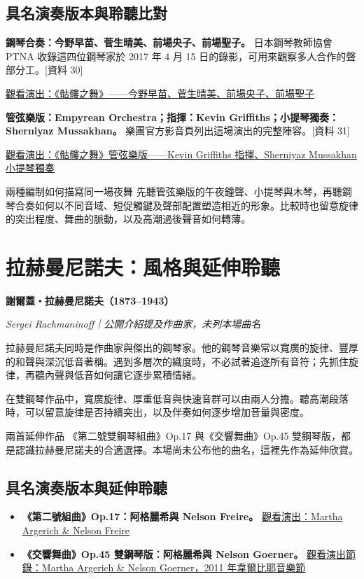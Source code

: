 \documentclass[UTF8,12pt,a4paper,fontset=none]{ctexart}
\newcommand{\src}[1]{{\small\color{accent}[資料 #1]}}
\newcommand{\work}[2]{\textbf{#1}\par{\small\itshape #2}\par}
\begin{document}
\subsection{具名演奏版本與聆聽比對}
\textbf{鋼琴合奏：今野早苗、菅生晴美、前場央子、前場聖子。} 日本鋼琴教師協會 PTNA 收錄這四位鋼琴家於 2017 年 4 月 15 日的錄影，可用來觀察多人合作的聲部分工。\src{30}

\noindent
\href{https://youtu.be/E2cIH5tMAoA}{觀看演出：《骷髏之舞》——今野早苗、菅生晴美、前場央子、前場聖子}

\medskip
\textbf{管弦樂版：Empyrean Orchestra；指揮：Kevin Griffiths；小提琴獨奏：Sherniyaz Mussakhan。} 樂團官方影音頁列出這場演出的完整陣容。\src{31}

\noindent
\href{https://youtu.be/LxKQpEVYWog}{觀看演出：《骷髏之舞》管弦樂版——Kevin Griffiths 指揮、Sherniyaz Mussakhan 小提琴獨奏}

\begin{listen}{兩種編制如何描寫同一場夜舞}
先聽管弦樂版的午夜鐘聲、小提琴與木琴，再聽鋼琴合奏如何以不同音域、短促觸鍵及聲部配置塑造相近的形象。比較時也留意旋律的突出程度、舞曲的脈動，以及高潮過後聲音如何轉薄。
\end{listen}

\clearpage
\section{拉赫曼尼諾夫：風格與延伸聆聽}
\work{謝爾蓋・拉赫曼尼諾夫（1873--1943）}{Sergei Rachmaninoff｜公開介紹提及作曲家，未列本場曲名}
拉赫曼尼諾夫同時是作曲家與傑出的鋼琴家。他的鋼琴音樂常以寬廣的旋律、豐厚的和聲與深沉低音著稱。遇到多層次的織度時，不必試著追逐所有音符；先抓住旋律，再聽內聲與低音如何讓它逐步累積情緒。

在雙鋼琴作品中，寬廣旋律、厚重低音與快速音群可以由兩人分擔。聽高潮段落時，可以留意旋律是否持續突出，以及伴奏如何逐步增加音量與密度。

\begin{listen}{兩首延伸作品}
《第二號雙鋼琴組曲》Op.17 與《交響舞曲》Op.45 雙鋼琴版，都是認識拉赫曼尼諾夫的合適選擇。本場尚未公布他的曲名，這裡先作為延伸欣賞。
\end{listen}

\subsection{具名演奏版本與延伸聆聽}
\begin{itemize}
\item \textbf{《第二號組曲》Op.17：阿格麗希與 Nelson Freire。}
\href{https://youtu.be/wYLasmJdeEg}{觀看演出：Martha Argerich \& Nelson Freire}
\item \textbf{《交響舞曲》Op.45 雙鋼琴版：阿格麗希與 Nelson Goerner。}
\href{https://vimeo.com/27052613}{觀看演出節錄：Martha Argerich \& Nelson Goerner，2011 年韋爾比耶音樂節}
\end{itemize}
\end{document}
